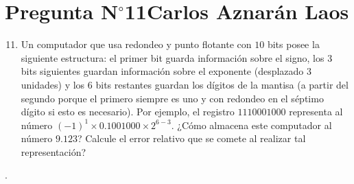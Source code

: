 \section{Pregunta N$^{\circ}$11\qquad Carlos Aznarán Laos}

\begin{frame}
	\begin{enumerate}\setcounter{enumi}{10}
		\item

		      Un computador que usa redondeo y punto flotante con $10$
		      bits posee la siguiente estructura:
		      el primer bit guarda información sobre el signo, los 3 bits
		      siguientes guardan información sobre el exponente
		      (desplazado $3$ unidades) y los $6$ bits restantes guardan
		      los dígitos de la mantisa (a partir del segundo porque el
		      primero siempre es uno y con redondeo en el séptimo dígito
		      si esto es necesario).
		      Por ejemplo, el registro $1110001000$ representa al número
		      ${\left(-1\right)}^{1}\times 0.1001000\times 2^{6-3}$.
		      ¿Cómo almacena este computador al número $9.123$?
		      Calcule el error relativo que se comete al realizar tal
		      representación?
	\end{enumerate}

	\begin{solution}

        
		.
	\end{solution}
\end{frame}